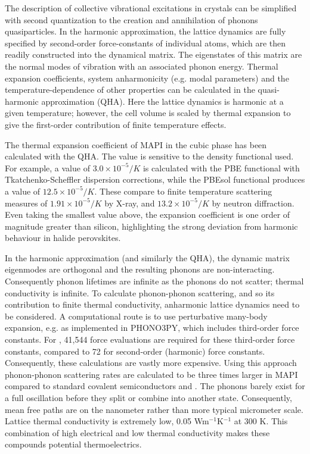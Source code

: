 The description of collective vibrational excitations in crystals can be simplified with second quantization to the creation and annihilation of phonons quasiparticles.
In the harmonic approximation, the lattice dynamics are fully specified by second-order force-constants of individual atoms, which are then readily constructed into the dynamical matrix. 
The eigenstates of this matrix are the normal modes of vibration with an associated phonon energy. 
Thermal expansion coefficients, system anharmonicity (e.g. modal \grun parameters) and the temperature-dependence of other properties can be calculated in the quasi-harmonic approximation (QHA). 
Here the lattice dynamics is harmonic at a given temperature; however, the cell volume is scaled by thermal expansion to give the first-order contribution of finite temperature effects. 

The thermal expansion coefficient of MAPI in the cubic phase has been calculated with the QHA.
The value is sensitive to the density functional used.
For example, a value of $3.0 \times 10^{-5} /K$ is calculated with the PBE functional with Tkatchenko-Scheffler dispersion corrections,\autocite{Saidi2016} while the PBEsol functional produces a value of $12.5 \times 10^{-5} /K$.\autocite{Brivio2015a} 
These compare to finite temperature scattering measures of $1.91 \times 10^{-5} /K$ by X-ray,\autocite{Baikie2013} and $13.2 \times 10^{-5} /K$ by neutron diffraction.\autocite{Weller2015} 
Even taking the smallest value above, the expansion coefficient is one order of magnitude greater than silicon,\autocite{Madelung2003} highlighting the strong deviation from harmonic behaviour in halide perovskites.

In the harmonic approximation (and similarly the QHA), the dynamic matrix eigenmodes are orthogonal and the resulting phonons are non-interacting.
Consequently phonon lifetimes are infinite as the phonons do not scatter; thermal conductivity is infinite. 
To calculate phonon-phonon scattering, and so its contribution to finite thermal conductivity, anharmonic lattice dynamics need to be considered.
A computational route is to use perturbative many-body expansion, e.g. as implemented in \textsc{PHONO3PY},\autocite{Togo2015} which includes third-order force constants. 
For , 41,544 force evaluations are required for these third-order force constants, compared to 72 for second-order (harmonic) force constants.\autocite{Whalley2016}
Consequently, these calculations are vastly more expensive. 
Using this approach phonon-phonon scattering rates are calculated to be three times larger in MAPI compared to standard covalent semiconductors  and .\autocite{Whalley2016} 
The phonons barely exist for a full oscillation before they split or combine into another state. 
Consequently, mean free paths are on the nanometer rather than more typical micrometer scale. 
Lattice thermal conductivity is extremely low, 0.05 Wm$^{-1}$K$^{-1}$ at 300 K.\autocite{Whalley2016}
This combination of high electrical and low thermal conductivity makes these compounds potential thermoelectrics.\autocite{He2014,Mettan2015}

